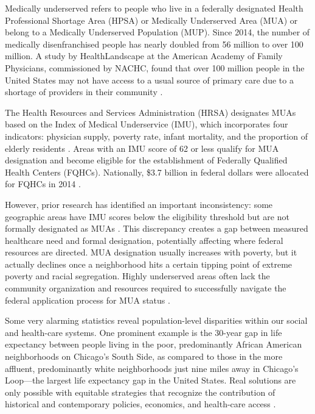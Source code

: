 \documentclass[11pt]{article}
\begin{document}
Medically underserved refers to people who live in a federally designated Health Professional 
Shortage Area (HPSA) or Medically Underserved Area (MUA) or belong to a Medically Underserved 
Population (MUP). Since 2014, the number of medically disenfranchised people has nearly doubled 
from 56 million to over 100 million. A study by HealthLandscape at the American Academy of Family 
Physicians, commissioned by NACHC, found that over 100 million people in the United States may not 
have access to a usual source of primary care due to a shortage of providers in their community \cite{NACHC2014}.

The Health Resources and Services Administration (HRSA) designates MUAs based on the Index of Medical 
Underservice (IMU), which incorporates four indicators: physician supply, poverty rate, infant mortality, 
and the proportion of elderly residents \cite{HRSA_BPHC}. Areas with an IMU score of 62 or less qualify 
for MUA designation and become eligible for the establishment of Federally Qualified Health Centers (FQHCs). 
Nationally, \$3.7 billion in federal dollars were allocated for FQHCs in 2014 \cite{NACHC2014}.

However, prior research has identified an important inconsistency: some geographic areas have IMU scores 
below the eligibility threshold but are not formally designated as MUAs \cite{kim2020uneven}. This discrepancy
 creates a gap between measured healthcare need and formal designation, potentially affecting where federal 
 resources are directed. MUA designation usually increases with poverty, but it actually declines once a 
 neighborhood hits a certain tipping point of extreme poverty and racial segregation. Highly underserved 
 areas often lack the community organization and resources required to successfully navigate the federal
 application process for MUA status \cite{kim2020uneven}.

Some very alarming statistics reveal population-level disparities within our social and health-care systems. 
One prominent example is the 30-year gap in life expectancy between people living in the poor, predominantly 
African American neighborhoods on Chicago's South Side, as compared to those in the more affluent, predominantly 
white neighborhoods just nine miles away in Chicago's Loop---the largest life expectancy gap in the United States. 
Real solutions are only possible with equitable strategies that recognize the contribution of historical and 
contemporary policies, economics, and health-care access \cite{smithcommunity}.
\end{document}
